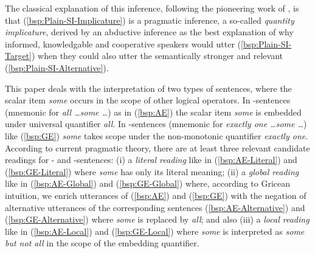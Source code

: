 \documentclass[fleqn,reqno,10pt,draft]{article}
\newcommand{\as}{\acro{as}}
\renewcommand{\es}{\acro{es}}
\begin{document}
\noindent The classical explanation of this inference, following the
pioneering work of \citet{Grice1975:Logic-and-Conve} \citep[see][for
recent overview]{Geurts2010:Quantity-Implic}, is that
(\ref{bsp:Plain-SI-Implicature}) is a pragmatic inference, a so-called
\emph{quantity implicature}, derived by an abductive inference as the
best explanation of why informed, knowledgable and cooperative
speakers would utter (\ref{bsp:Plain-SI-Target}) when they could also
utter the semantically stronger and relevant
(\ref{bsp:Plain-SI-Alternative}).




This paper deals with the interpretation of two types of sentences,
where the scalar item \emph{some} occurs in the scope of other logical
operators. In \as-sentences (mnemonic for \textit{all \dots some \dots})
as in (\ref{bsp:AE}) the scalar item \emph{some} is embedded under
universal quantifier \emph{all}. In \es-sentences (mnemonic for
\textit{exactly one \dots some \dots}) like (\ref{bsp:GE}) \emph{some}
takes scope under the non-monotonic quantifier \emph{exactly one}.
According to current pragmatic theory, there are at least three
relevant candidate readings for \as- and \es-sentences: (i) a
\emph{literal reading} like in (\ref{bsp:AE-Literal}) and
(\ref{bsp:GE-Literal}) where \emph{some} has only its literal meaning;
(ii) a \emph{global reading} like in (\ref{bsp:AE-Global}) and
(\ref{bsp:GE-Global}) where, according to Gricean intuition, we enrich
utterances of (\ref{bsp:AE}) and (\ref{bsp:GE}) with the negation of
alternative utterances of the corresponding sentences
(\ref{bsp:AE-Alternative}) and (\ref{bsp:GE-Alternative}) where
\emph{some} is replaced by \emph{all}; and also (iii) a \emph{local
  reading} like in (\ref{bsp:AE-Local}) and (\ref{bsp:GE-Local}) where
\emph{some} is interpreted as \emph{some but not all} in the scope of
the embedding quantifier.
\end{document}

